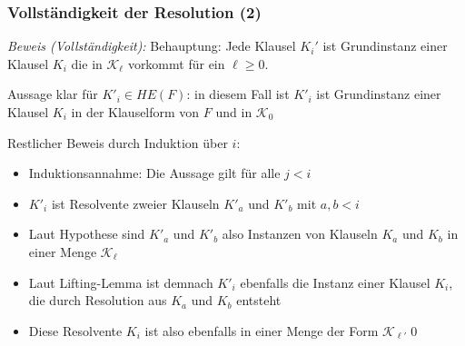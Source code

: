 \documentclass[aspectratio=1610,onlymath]{beamer}
\begin{document}
\begin{frame}[t]\frametitle{Vollständigkeit der Resolution (2)}


\emph{Beweis (Vollständigkeit):} \alert{Behauptung:} Jede Klausel $K_i'$ ist Grundinstanz einer Klausel $K_i$ die in $\mathcal{K}_\ell$ vorkommt für ein $\ell\geq 0$.
\medskip\pause

Aussage klar für $K'_i\in HE(F)$: in diesem Fall ist $K'_i$ ist Grundinstanz einer Klausel $K_i$ in der Klauselform von $F$ und in $\mathcal{K}_0$\medskip\pause

Restlicher Beweis durch Induktion über $i$:
\begin{itemize}
\item Induktionsannahme: Die Aussage gilt für alle $j<i$\pause
\item $K'_i$ ist Resolvente zweier Klauseln $K'_a$ und $K'_b$ mit $a,b<i$\pause
\item Laut Hypothese sind $K'_a$ und $K'_b$ also Instanzen von Klauseln $K_a$ und $K_b$ in einer Menge $\mathcal{K}_\ell$\pause
\item Laut Lifting-Lemma ist demnach $K'_i$ ebenfalls die Instanz einer Klausel $K_i$, die durch Resolution aus $K_a$ und $K_b$ entsteht\pause
\item Diese Resolvente $K_i$ ist also ebenfalls in einer Menge der Form $\mathcal{K}_{\ell'}$\qed
\end{itemize}

\end{frame}
\end{document}
